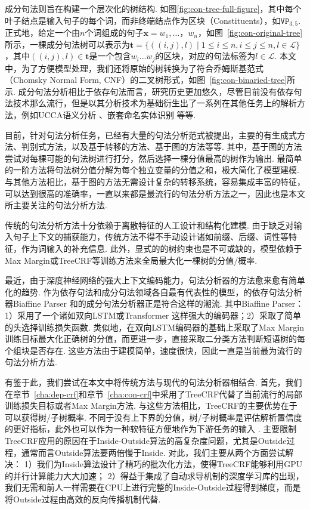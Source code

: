 
成分句法则旨在构建一个层次化的树结构.
如图\ref{fig:con-tree-full-figure}，其中每个叶子结点是输入句子的每个词，而非终端结点作为区块（Constituents），如$\texttt{VP}_{3,5}$.
正式地，给定一个由$n$个词组成的句子$\boldsymbol{x}=w_1,\dots，w_{n}$，如图~\ref{fig:con-original-tree}所示，一棵成分句法树可以表示为$\boldsymbol{t}=\{((i, j),l)\mid 1\le i \le n,i \le j \le n,l \in \mathcal{L}\}$，其中$((i,j),l) \in \boldsymbol{t}$是一个包含$w_{i}...w_{j}$的区块，对应的句法标签为$l \in \mathcal{L}$.
本文中，为了方便模型处理，我们还将原始的树转换为了符合乔姆斯基范式（Chomsky Normal Form, CNF）的二叉树形式，如图~\ref{fig:con-binaried-tree}所示.
成分句法分析相比于依存句法而言，研究历史更加悠久，尽管目前没有依存句法技术那么流行，但是以其分析技术为基础衍生出了一系列在其他任务上的解析方法，例如UCCA语义分析 \citep{jiang-etal-2019-hlt}、嵌套命名实体识别 \citep{fu-etal-2021-nested}等等.

目前，针对句法分析任务，已经有大量的句法分析范式被提出，主要的有生成式方法、判别式方法，以及基于转移的方法、基于图的方法等等.
其中，基于图的方法尝试对每棵可能的句法树进行打分，然后选择一棵分值最高的树作为输出.
最简单的一阶方法将句法树分值分解为每个独立变量的分值之和，极大简化了模型建模.
与其他方法相比，基于图的方法无需设计复杂的转移系统，容易集成丰富的特征，可以达到很高的准确率，一直以来都是最流行的句法分析方法之一，因此也是本文所主要关注的句法分析方法.

传统的句法分析方法十分依赖于离散特征的人工设计和结构化建模.
由于缺乏对输入句子上下文的捕获能力，传统方法不得不手动设计诸如前缀、后缀、词性等特征，作为词输入的补充信息.
此外，显式的的树约束也是不可或缺的，模型依赖于Max Margin或TreeCRF等训练方法来全局最大化一棵树的分值/概率.

最近，由于深度神经网络的强大上下文编码能力，句法分析器的方法愈来愈有简单化的趋势.
作为依存句法和成分句法领域各自最有代表性的模型，\citet{dozat-etal-2017-biaffine}的依存句法分析器Biaffine Parser 和\citet{stern-etal-2017-minimal}的成分句法分析器正是符合这样的潮流.
其中Biaffine Parser： 1）采用了一个诸如双向LSTM或Transformer \citep{vaswani-2017-attention}这样强大的编码器；2）采取了简单的头选择训练损失函数.
类似地，\citet{stern-etal-2017-minimal}在双向LSTM编码器的基础上采取了Max Margin训练目标最大化正确树的分值，而\citet{gaddy-etal-2018-whats}更进一步，直接采取二分类方法判断短语树的每个组块是否存在.
这些方法由于建模简单，速度很快，因此一直是当前最为流行的句法分析方法.

有鉴于此，我们尝试在本文中将传统方法与现代的句法分析器相结合.
首先，我们在章节~\ref{cha:dep-crf}和章节~\ref{cha:con-crf}中采用了TreeCRF代替了当前流行的局部训练损失目标或者Max Margin方法.
与这些方法相比，TreeCRF的主要优势在于可以获得树/子树概率.
不同于没有上下界的分值，树/子树概率是评估解析置信度的更好指标，此外也可以作为一种软特征方便地作为下游任务的输入 \citep{zhang-etal-2019-syntax,zhang-etal-2020-syntax}.
主要限制TreeCRF应用的原因在于Inside-Outside算法的高复杂度问题，尤其是Outside过程，通常而言Outside算法要两倍慢于Inside.
对此，我们主要从两个方面尝试解决：
1）我们为Inside算法设计了精巧的批次化方法，使得TreeCRF能够利用GPU的并行计算能力大大加速；
2）得益于集成了自动求导机制的深度学习库的出现，我们无需和前人一样需要在CPU上进行完整的Inside-Outside过程得到梯度，而是将Outside过程由高效的反向传播机制代替.


